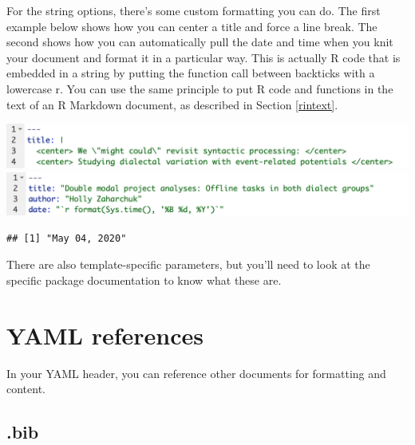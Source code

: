 \documentclass[
]{book}
\newenvironment{Shaded}{\begin{snugshade}}{\end{snugshade}}
\newcommand{\CommentTok}[1]{\textcolor[rgb]{0.56,0.35,0.01}{\textit{#1}}}
\newcommand{\KeywordTok}[1]{\textcolor[rgb]{0.13,0.29,0.53}{\textbf{#1}}}
\newcommand{\NormalTok}[1]{#1}
\newcommand{\StringTok}[1]{\textcolor[rgb]{0.31,0.60,0.02}{#1}}
\begin{document}
For the string options, there's some custom formatting you can do. The first example below shows how you can center a title and force a line break. The second shows how you can automatically pull the date and time when you knit your document and format it in a particular way. This is actually R code that is embedded in a string by putting the function call between backticks with a lowercase r. You can use the same principle to put R code and functions in the text of an R Markdown document, as described in Section \ref{rintext}.

\includegraphics[width=17.36in]{images/formatting_title}
\includegraphics[width=17.69in]{images/formatting_date}

\begin{Shaded}
\end{Shaded}

\begin{verbatim}
## [1] "May 04, 2020"
\end{verbatim}

There are also template-specific parameters, but you'll need to look at the specific package documentation to know what these are.

\hypertarget{yamlref}{%
\section{YAML references}\label{yamlref}}

In your YAML header, you can reference other documents for formatting and content.

\hypertarget{bib}{%
\subsection{.bib}\label{bib}}
\end{document}
